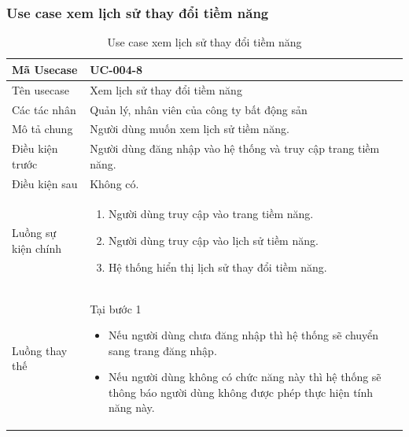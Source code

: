 \documentclass[12pt,a4paper]{article}
\begin{document}
    \subsubsection*{Use case xem lịch sử thay đổi tiềm năng}
    \begin{table}[H]
        \centering
        \begin{tabular}{|p{3.5cm}|p{11.5cm}|c|}
            \hline
            Mã Usecase      & UC-004-8                                                       \\
            \hline
            Tên usecase     & Xem lịch sử thay đổi tiềm năng                                 \\
            \hline
            Các tác nhân    & Quản lý, nhân viên của công ty bất động sản                    \\
            \hline
            Mô tả chung     & Người dùng muốn xem lịch sử tiềm năng.                         \\
            \hline
            Điều kiện trước & Người dùng đăng nhập vào hệ thống và truy cập trang tiềm năng. \\
            \hline
            Điều kiện sau   & Không có.                                                      \\
            \hline
            Luồng sự kiện chính & \vspace{-.8cm}\begin{enumerate}
                                                    \item Người dùng truy cập vào trang tiềm năng.
                                                    \item Người dùng truy cập vào lịch sử tiềm năng.
                                                    \item Hệ thống hiển thị lịch sử thay đổi tiềm năng.
            \end{enumerate}
            \\
            \hline
            Luồng thay thế & Tại bước 1\newline
            \vspace{-.8cm}\begin{itemize}
                              \item Nếu người dùng chưa đăng nhập thì hệ thống sẽ chuyển sang trang đăng nhập.
                              \item Nếu người dùng không có chức năng này thì hệ thống sẽ thông báo người dùng không được phép thực hiện tính năng này.
            \end{itemize}
            \\ \hline
        \end{tabular}
        \caption{Use case xem lịch sử thay đổi tiềm năng}
    \end{table}
\end{document}
